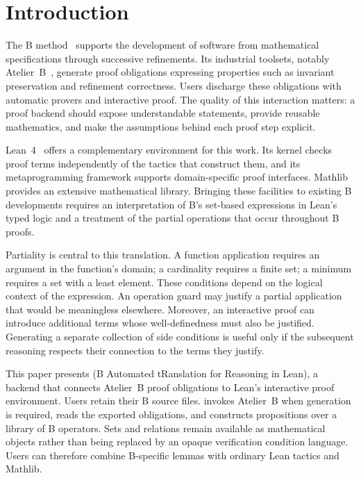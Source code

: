 \section{Introduction}
\label{sec:introduction}

The B method~\cite{AbrialBBook} supports the development of software from
mathematical specifications through successive refinements. Its industrial
toolsets, notably Atelier~B~\cite{AtelierB}, generate proof obligations
expressing properties such as invariant preservation and refinement
correctness. Users discharge these obligations with automatic provers
and interactive proof. The quality of this interaction matters: a proof
backend should expose understandable statements, provide reusable
mathematics, and make the assumptions behind each proof step explicit.

Lean~4~\cite{lean} offers a complementary environment for this work. Its
kernel checks proof terms independently of the tactics that construct
them, and its metaprogramming framework supports domain-specific proof
interfaces. Mathlib~\cite{mathlib4} provides an extensive mathematical
library. Bringing these facilities to existing B developments requires
an interpretation of B's set-based expressions in Lean's typed logic and
a treatment of the partial operations that occur throughout B proofs.

Partiality is central to this translation. A function application requires
an argument in the function's domain; a cardinality requires a finite
set; a minimum requires a set with a least element. These conditions
depend on the logical context of the expression. An operation guard may
justify a partial application that would be meaningless elsewhere.
Moreover, an interactive proof can introduce additional terms whose
well-definedness must also be justified. Generating a separate collection
of side conditions is useful only if the subsequent reasoning respects
their connection to the terms they justify.

This paper presents \barrel (B Automated tRanslation for Reasoning
in Lean), a backend that connects Atelier~B proof obligations to Lean's
interactive proof environment. Users retain their B source files.
\barrel invokes Atelier~B when generation is required, reads the exported
obligations, and constructs propositions over a library of B operators.
Sets and relations remain available as mathematical objects rather than
being replaced by an opaque verification condition language. Users can
therefore combine B-specific lemmas with ordinary Lean tactics and Mathlib.

